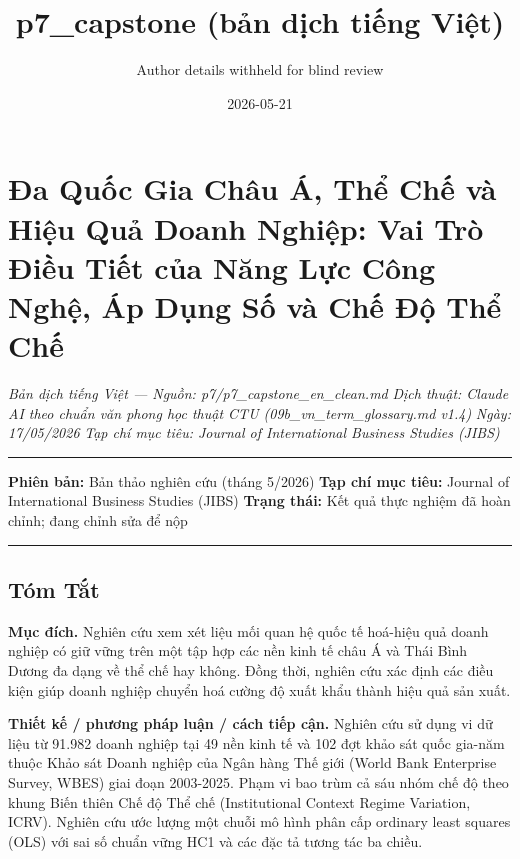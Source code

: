 \documentclass[12pt,a4paper]{article}
\title{p7\_capstone (bản dịch tiếng Việt)}
\author{Author details withheld for blind review}
\date{2026-05-21}
\begin{document}
\maketitle

\hypertarget{ux111a-quux1ed1c-gia-chuxe2u-uxe1-thux1ec3-chux1ebf-vuxe0-hiux1ec7u-quux1ea3-doanh-nghiux1ec7p-vai-truxf2-ux111iux1ec1u-tiux1ebft-cux1ee7a-nux103ng-lux1ef1c-cuxf4ng-nghux1ec7-uxe1p-dux1ee5ng-sux1ed1-vuxe0-chux1ebf-ux111ux1ed9-thux1ec3-chux1ebf}{%
\section{Đa Quốc Gia Châu Á, Thể Chế và Hiệu Quả Doanh Nghiệp: Vai Trò
Điều Tiết của Năng Lực Công Nghệ, Áp Dụng Số và Chế Độ Thể
Chế}\label{ux111a-quux1ed1c-gia-chuxe2u-uxe1-thux1ec3-chux1ebf-vuxe0-hiux1ec7u-quux1ea3-doanh-nghiux1ec7p-vai-truxf2-ux111iux1ec1u-tiux1ebft-cux1ee7a-nux103ng-lux1ef1c-cuxf4ng-nghux1ec7-uxe1p-dux1ee5ng-sux1ed1-vuxe0-chux1ebf-ux111ux1ed9-thux1ec3-chux1ebf}}

\emph{Bản dịch tiếng Việt --- Nguồn: p7/p7\_capstone\_en\_clean.md}
\emph{Dịch thuật: Claude AI theo chuẩn văn phong học thuật CTU
(09b\_vn\_term\_glossary.md v1.4)} \emph{Ngày: 17/05/2026} \emph{Tạp chí
mục tiêu: Journal of International Business Studies (JIBS)}

\begin{center}\rule{0.5\linewidth}{0.5pt}\end{center}

\textbf{Phiên bản:} Bản thảo nghiên cứu (tháng 5/2026) \textbf{Tạp chí
mục tiêu:} Journal of International Business Studies (JIBS)
\textbf{Trạng thái:} Kết quả thực nghiệm đã hoàn chỉnh; đang chỉnh sửa
để nộp

\begin{center}\rule{0.5\linewidth}{0.5pt}\end{center}

\hypertarget{tuxf3m-tux1eaft}{%
\subsection{Tóm Tắt}\label{tuxf3m-tux1eaft}}

\textbf{Mục đích.} Nghiên cứu xem xét liệu mối quan hệ quốc tế hoá-hiệu
quả doanh nghiệp có giữ vững trên một tập hợp các nền kinh tế châu Á và
Thái Bình Dương đa dạng về thể chế hay không. Đồng thời, nghiên cứu xác
định các điều kiện giúp doanh nghiệp chuyển hoá cường độ xuất khẩu thành
hiệu quả sản xuất.

\textbf{Thiết kế / phương pháp luận / cách tiếp cận.} Nghiên cứu sử dụng
vi dữ liệu từ 91.982 doanh nghiệp tại 49 nền kinh tế và 102 đợt khảo sát
quốc gia-năm thuộc Khảo sát Doanh nghiệp của Ngân hàng Thế giới (World
Bank Enterprise Survey, WBES) giai đoạn 2003-2025. Phạm vi bao trùm cả
sáu nhóm chế độ theo khung Biến thiên Chế độ Thể chế (Institutional
Context Regime Variation, ICRV). Nghiên cứu ước lượng một chuỗi mô hình
phân cấp ordinary least squares (OLS) với sai số chuẩn vững HC1 và các
đặc tả tương tác ba chiều.
\end{document}

